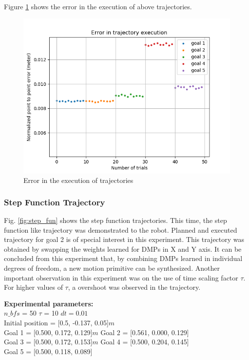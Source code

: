 Figure \ref{fig:inv_par_3_e} shows the error in the execution of above trajectories. 

\begin{figure}[H]
	\centering
	\includegraphics[scale=0.65]{images/1/inv_par_3_e.png}
	\caption{Error in the execution of trajectories}
	\label{fig:inv_par_3_e}
\end{figure}

\subsubsection{Step Function Trajectory}

Fig. \ref{fig:step_fun} shows the step function trajectories. This time, the step function like trajectory was demonstrated to the robot. Planned and executed trajectory for goal 2 is of special interest in this experiment. This trajectory was obtained by swapping the weights learned for DMPs in X and Y axis. It can be concluded from this experiment that, by combining DMPs learned in individual degrees of freedom, a new motion primitive can be synthesized. Another important observation in this experiment was on the use of time scaling factor $\tau$. For higher values of $\tau$, a overshoot was observed in the trajectory. 

\textbf{Experimental parameters:} \\
$n\_bfs$ = 50 \hspace{3cm}
$\tau$ = 10 \hspace{3cm}
$dt = 0.01$\\
Initial position = [0.5, -0.137, 0.05]$m$\\
Goal 1 = [0.500, 0.172, 0.129]$m$ \hspace{2cm}
Goal 2 = [0.561, 0.000, 0.129]\\
Goal 3 = [0.500, 0.172, 0.153]$m$ \hspace{2cm}
Goal 4 = [0.500, 0.204, 0.145]\\
Goal 5 = [0.500, 0.118, 0.089]

